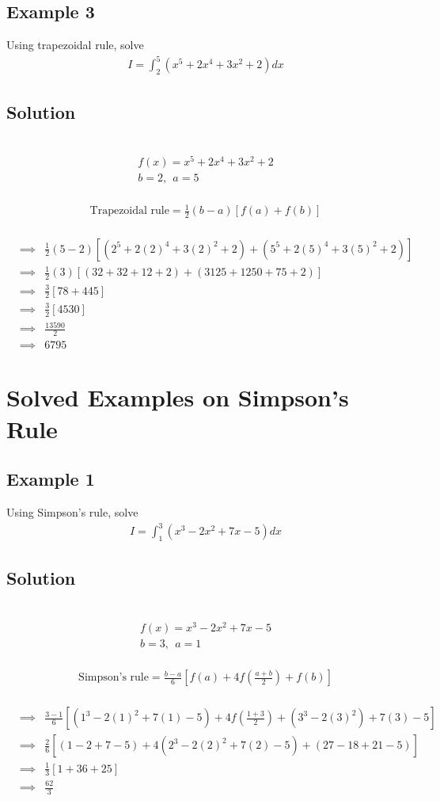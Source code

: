 \documentclass[12pt]{report}
\newcommand{\sps}{\\[0.2cm]}
\begin{document}
	\subsection{Example 3}
	Using trapezoidal rule, solve
	\begin{eqnarray*}
		I = \int_2^5\left(x^5 + 2x^4 + 3x^2 + 2\right)dx
	\end{eqnarray*}
	
	\subsection*{Solution}
	{~}\\[-2.1cm]
	\begin{gather*}
		f(x) = x^5 + 2x^4 + 3x^2 + 2\sps
		b=2,~~ a=5
	\end{gather*}
	{~}\\[-2.1cm]
	\begin{gather*}
		\text{Trapezoidal rule} = \frac{1}{2}(b-a)[f(a) + f(b)]
	\end{gather*}
	{~}\\[-2.1cm]
	\begin{eqnarray*}
		&\implies&\frac{1}{2}(5-2)[(2^5 + 2(2)^4 + 3(2)^2 + 2) + (5^5 + 2(5)^4+3(5)^2 + 2)]\sps
		&\implies& \frac{1}{2}(3)[(32+32+12+2) + (3125+1250+75+2)]\sps
		&\implies& \frac{3}{2}[78+445]\sps
		&\implies& \frac{3}{2}[4530]\sps
		&\implies& \frac{13590}{2}\sps
		&\implies& 6795
	\end{eqnarray*}
	
	\section{Solved Examples on Simpson's Rule}
	\subsection{Example 1}
	Using Simpson's rule, solve
	\begin{eqnarray*}
		I = \int_1^3\left(x^3 - 2x^2 + 7x - 5\right)dx
	\end{eqnarray*}
	
	\subsection*{Solution}
	{~}\\[-2.1cm]
	\begin{gather*}
		f(x) = x^3 - 2x^2 + 7x - 5\sps
		b=3,~~ a=1
	\end{gather*}
	{~}\\[-2.1cm]
	\begin{gather*}
		\text{Simpson's rule} = \frac{b-a}{6}\left[f(a)+ 4f\left(\frac{a+b}{2}\right) + f(b)\right]
	\end{gather*}
	{~}\\[-1.5cm]
	\begin{eqnarray*}
		&\implies&\frac{3-1}{6}\left[(1^3 -2(1)^2 + 7(1)-5)+ 4f\left(\frac{1+3}{2}\right)+(3^3 - 2(3)^2) + 7(3)-5\right]\sps
		&\implies& \frac{2}{6}\left[(1-2+7-5) + 4(2^3 - 2(2)^2 + 7(2)-5) + (27-18+21-5)\right]\sps
		&\implies& \frac{1}{3}[1+36+25]\sps
		&\implies& \frac{62}{3}
	\end{eqnarray*}
	
\end{document}
